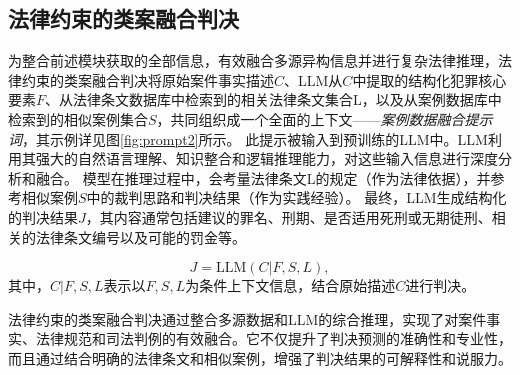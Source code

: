 


\subsection{\heiti 法律约束的类案融合判决}
为整合前述模块获取的全部信息，有效融合多源异构信息并进行复杂法律推理，法律约束的类案融合判决将原始案件事实描述$C$、LLM从$C$中提取的结构化犯罪核心要素$F$、从法律条文数据库中检索到的相关法律条文集合L，以及从案例数据库中检索到的相似案例集合$S$，共同组织成一个全面的上下文——\textit{案例数据融合提示词}，其示例详见图\ref{fig:prompt2}所示。
此提示被输入到预训练的LLM中。LLM利用其强大的自然语言理解、知识整合和逻辑推理能力，对这些输入信息进行深度分析和融合。
模型在推理过程中，会考量法律条文L的规定（作为法律依据），并参考相似案例$S$中的裁判思路和判决结果（作为实践经验）。
最终，LLM生成结构化的判决结果$J$，其内容通常包括建议的罪名、刑期、是否适用死刑或无期徒刑、相关的法律条文编号以及可能的罚金等。

\begin{equation}
	J=\text{LLM}(C|F,S,L),
\end{equation}
其中，$C | F,S,L $表示以$F,S,L$为条件上下文信息，结合原始描述$C$进行判决。

法律约束的类案融合判决通过整合多源数据和LLM的综合推理，实现了对案件事实、法律规范和司法判例的有效融合。它不仅提升了判决预测的准确性和专业性，而且通过结合明确的法律条文和相似案例，增强了判决结果的可解释性和说服力。


